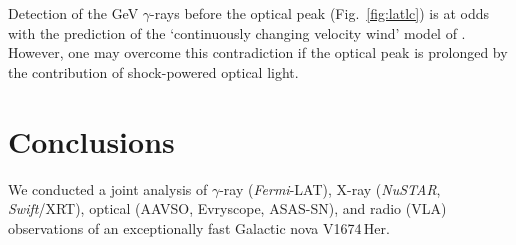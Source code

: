 \documentclass[a4paper,fleqn,usenatbib]{mnras}
\newcommand{\nova}{V1674\,Her}
\newcommand{\fermilat}{\emph{Fermi}-LAT}
\begin{document}
Detection of the GeV $\gamma$-rays before the optical peak (Fig.~\ref{fig:latlc})
is at odds with the prediction of the `continuously changing velocity wind'
model of \cite{2022ApJ...939....1H}. However, one may overcome this
contradiction if the optical peak is prolonged by the contribution of
shock-powered optical light.


\section{Conclusions}
\label{sec:conclusions}

We conducted a joint analysis of $\gamma$-ray (\fermilat{}), X-ray ({\em NuSTAR}, {\em Swift}/XRT), optical (AAVSO, Evryscope,
ASAS-SN), and radio (VLA) observations of an exceptionally fast Galactic nova \nova{}.
\end{document}
